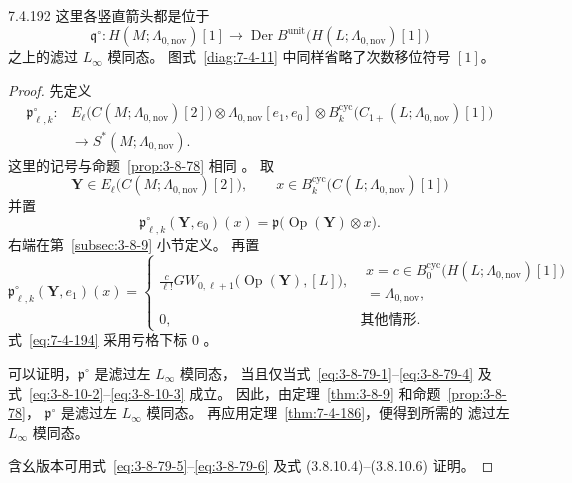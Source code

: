 \begin{theorem}{7.4.192}
这里各竖直箭头都是位于
\[
\mathfrak q^\circ\colon
H(M;\Lambda_{0,\mathrm{nov}})[1]
\longrightarrow
\operatorname{Der}B^{\mathrm{unit}}
\bigl(H(L;\Lambda_{0,\mathrm{nov}})[1]\bigr)
\]
之上的滤过 $L_\infty$ 模同态。
图式~\ref{diag:7-4-11} 中同样省略了次数移位符号 $[1]$。
\end{theorem}

\begin{proof}
先定义
\[
\begin{aligned}
\mathfrak p^\circ_{\ell,k}\colon{}&
E_\ell\bigl(C(M;\Lambda_{0,\mathrm{nov}})[2]\bigr)
\otimes\Lambda_{0,\mathrm{nov}}[e_1,e_0]
\otimes
B_k^{\mathrm{cyc}}
\bigl(C_{1+}(L;\Lambda_{0,\mathrm{nov}})[1]\bigr)\\
&\longrightarrow S^*(M;\Lambda_{0,\mathrm{nov}}).
\end{aligned}
\]
这里的记号与命题~\ref{prop:3-8-78} 相同
。
取
\[
\mathbf Y\in
E_\ell\bigl(C(M;\Lambda_{0,\mathrm{nov}})[2]\bigr),
\qquad
x\in
B_k^{\mathrm{cyc}}
\bigl(C(L;\Lambda_{0,\mathrm{nov}})[1]\bigr)
\]
并置
\begin{equation}
\mathfrak p^\circ_{\ell,k}(\mathbf Y,e_0)(x)
=
\mathfrak p\bigl(\operatorname{Op}(\mathbf Y)\otimes x\bigr).
\tag{7.4.193}\label{eq:7-4-193}
\end{equation}
右端在第~\ref{subsec:3-8-9} 小节定义。
再置
\begin{equation}
\mathfrak p^\circ_{\ell,k}(\mathbf Y,e_1)(x)
=
\begin{cases}
\displaystyle
\frac{c}{\ell!}
GW_{0,\ell+1}\bigl(\operatorname{Op}(\mathbf Y),[L]\bigr),
&
\begin{gathered}
x=c\in
B_0^{\mathrm{cyc}}
\bigl(H(L;\Lambda_{0,\mathrm{nov}})[1]\bigr)\\
=\Lambda_{0,\mathrm{nov}},
\end{gathered}\\[1.1em]
0,&\text{其他情形}.
\end{cases}
\tag{7.4.194}\label{eq:7-4-194}
\end{equation}
式~\eqref{eq:7-4-194} 采用亏格下标 $0$
。

可以证明，$\mathfrak p^\circ$ 是滤过左 $L_\infty$ 模同态，
当且仅当式~\eqref{eq:3-8-79-1}--\eqref{eq:3-8-79-4}
及式~\eqref{eq:3-8-10-2}--\eqref{eq:3-8-10-3} 成立。
因此，由定理~\ref{thm:3-8-9} 和命题~\ref{prop:3-8-78}，
$\mathfrak p^\circ$ 是滤过左 $L_\infty$ 模同态。
再应用定理~\ref{thm:7-4-186}，便得到所需的
滤过左 $L_\infty$ 模同态。

含幺版本可用式~\eqref{eq:3-8-79-5}--\eqref{eq:3-8-79-6}
及式 (3.8.10.4)--(3.8.10.6) 证明。
\end{proof}

